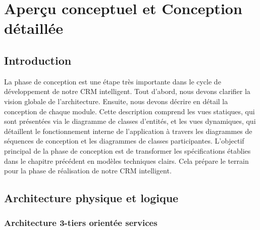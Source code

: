 \chapter{Aperçu conceptuel et Conception détaillée}
\label{chap:conception}

\section*{Introduction}

La phase de conception est une étape très importante dans le cycle de développement de notre CRM intelligent. Tout d’abord, nous devons clarifier la vision globale de l’architecture. Ensuite, nous devons décrire en détail la conception de chaque module. Cette description comprend les vues statiques, qui sont présentées via le diagramme de classes d’entités, et les vues dynamiques, qui détaillent le fonctionnement interne de l’application à travers les diagrammes de séquences de conception et les diagrammes de classes participantes. L’objectif principal de la phase de conception est de transformer les spécifications établies dans le chapitre précédent en modèles techniques clairs. Cela prépare le terrain pour la phase de réalisation de notre CRM intelligent.

\section{Architecture physique et logique}

\subsection{Architecture 3-tiers orientée services}

